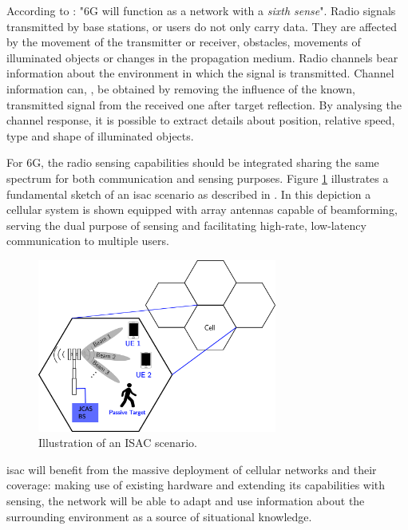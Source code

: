 According to \cite{Viswanathan_Wild_2021}: "6G will function as a network with a \textit{sixth sense}". Radio signals transmitted by base stations, or users do not only carry data. They are affected by the movement of the transmitter or receiver, obstacles, movements of illuminated objects or changes in the propagation medium. Radio channels bear information about the environment in which the signal is transmitted. 
Channel information can, \eg, be obtained by removing the influence of the known, transmitted signal from the received one after target reflection. By analysing the channel response, it is possible to extract details about position, relative speed, type and shape of illuminated objects.

For 6G, the radio sensing capabilities should be integrated sharing the same spectrum for both communication and sensing purposes. Figure \ref{fig:isac-scheme-1} illustrates a fundamental sketch of an \gls{isac} scenario as described in \cite{Wild_Grudnitsky_Mandelli_Henninger_Guan_Schaich_2023}. In this depiction a cellular system is shown equipped with array antennas capable of beamforming, serving the dual purpose of sensing and facilitating high-rate, low-latency communication to multiple users.

\begin{figure}[H]
	\centering
	\includegraphics[width=0.7\textwidth]{Images/introduction/isac-scheme-1.png}
	\caption{\alert{Illustration of an ISAC scenario.}}
	\label{fig:isac-scheme-1}
\end{figure}


\gls{isac} will benefit from the massive deployment of cellular networks and their coverage: making use of existing hardware and extending its capabilities with sensing, the network will be able to adapt and use information about the surrounding environment as a source of situational knowledge.



